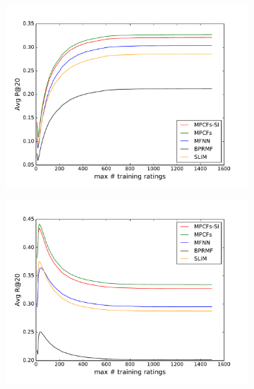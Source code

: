 \begin{figure}
	\centering
	\begin{subfigure}[b]{0.46\linewidth}
		\includegraphics[width=\linewidth]{./section-chapter2/figures/ml-1m_comparison_p20.pdf}
	\end{subfigure}
	\begin{subfigure}[b]{0.46\linewidth}
		\includegraphics[width=\linewidth]{./section-chapter2/figures/ml-1m_comparison_r20.pdf}
	\end{subfigure}
	\begin{subfigure}[b]{0.46\linewidth}

\end{subfigure}
\end{figure}
